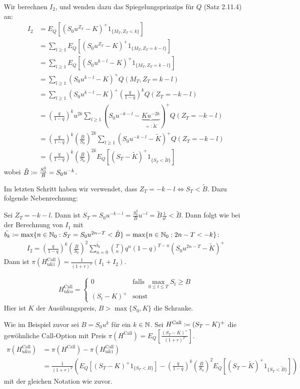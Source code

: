 \documentclass[a4paper,twoside,DIV15,BCOR12mm]{scrbook}
\begin{document}
\begin{beispiel}
Wir berechnen $I_2$, und wenden dazu das Spiegelungsprinzips für $Q$ (Satz 2.11.4) an:
\begin{align*}
I_2&=E_Q[(S_0u^{Z_T}-K)^+1_{\{M_T,Z_T<k\}}]\\
&= \sum\limits_{l\ge 1}E_Q[(S_0u^{Z_T}-K)^+1_{\{M_T,Z_T=k-l\}}]\\
&= \sum\limits_{l\ge 1}E_Q[(S_0u^{k-l}-K)^+1_{\{M_T,Z_T=k-l\}}]\\
&= \sum\limits_{l\ge 1}(S_0u^{k-l}-K)^+Q(M_T,Z_T=k-l)\\
&= \sum\limits_{l\ge 1}(S_0u^{k-l}-K)^+\left(\frac{q}{1-q}\right)^kQ(Z_T=-k-l)\\
&=\left(\frac{q}{1-q}\right)^ku^{2k}\sum\limits_{l\ge 1}(S_0u^{-k-l}-\underbrace{Ku^{-2k}}_{=:\tilde{K}})^+Q(Z_T=-k-l)\\
&= \left(\frac{q}{1-q}\right)^k\left(\frac{B}{S_0}\right)^{2k}\sum\limits_{l\ge 1}(S_0u^{-k-l}-\tilde{K})^+Q(Z_T=-k-l)\\
&=\left(\frac{q}{1-q}\right)^k\left(\frac{B}{S_0}\right)^{2k} E_Q[(S_T-\tilde{K})^+1_{\{S_T<\tilde{B}\}}]
\end{align*}
wobei $\tilde{B}\da\frac{S_0^2}{B}=S_0u^{-k}$.

Im letzten Schritt haben wir verwendet, dass $Z_T=-k-l\iff S_T<\tilde{B}$. Dazu folgende Nebenrechnung:

Sei $Z_T=-k-l$. Dann ist $S_T=S_0u^{-k-l}=\frac{S_0^2}{B}u^{-l}=\tilde{B}\frac{1}{u^l}<\tilde{B}$.  Dann folgt wie bei der Berechnung von $I_1$ mit $\tilde{b_k}\da\max\{n\in\MdN_0:S_T=S_0u^{2n-T}<\tilde{B}\}=\max\{n\in\MdN_0:2n-T<-k\}$:
\begin{align*}
I_2=\left(\frac{q}{1-q}\right)^k\left(\frac{B}{S_0}\right)^2 \sum\limits_{n=0}^{\tilde{b_k}} {T\choose n} q^n(1-q)^{T-n} (S_0u^{2n-T}-\tilde{K})^+
\end{align*}
Dann ist $\pi(H_{\text{u\&i}}^{\text{Call}})=\frac{1}{(1+r)^T}(I_1+I_2)$.
\end{beispiel}

\begin{beispiel}
\begin{align*}
H_{\text{u\&o}}^{\text{Call}} = 
\begin{cases}
0 & \text{falls }\max_{0\le t\le T}S_t \ge B \\
(S_t-K)^+ & \text{sonst}
\end{cases}
\end{align*}
Hier ist $K$ der Ausübungspreis, $B>\max\{S_0,K\}$ die Schranke.

Wie im Beispiel zuvor sei $B=S_0u^k$ für ein $k\in\mathbb{N}$.
Sei $H^{\text{Call}}\da(S_T-K)^+$ die gewöhnliche Call-Option mit Preis $\pi(H^{\text{Call}})=E_Q\left[\frac{(S_T-K)^+}{(1+r)^T}\right]$.
\begin{align*}
\pi(H_{\text{u\&o}}^{\text{Call}})&=\pi(H^{\text{Call}})-\pi(H_{\text{u\&i}}^{\text{Call}})\\
&=\frac{1}{(1+r)^T}(E_Q[(S_T-K)^+1_{\{S_T<B\}}]-\left(\frac{q}{1-q}\right)^k\left(\frac{B}{S_0}\right)^2E_Q[(S_T-\tilde{K})^+1_{\{S_T<\tilde{B}\}}])
\end{align*}
mit der gleichen Notation wie zuvor.
\end{beispiel}
\end{document}
